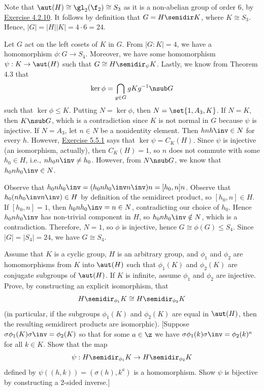 \begin{solalph}
    \item Note that $\aut(H) \cong \gl_2(\f_2) \cong S_3$ as it is a non-abelian group of order 6, by \hyperref[ex4.2.10]{Exercise 4.2.10}. It follows by definition that $G = H \semidir K$, where $K \cong S_3$. Hence, $|G| = |H||K| = 4 \cdot 6 = 24$.
    \item Let $G$ act on the left cosets of $K$ in $G$. From $|G : K| = 4$, we have a homomorphism $\phi : G \to S_4$. Moreover, we have some homomorphism $\psi : K \to \aut(H)$ such that $G \cong H \semidir_\psi K$. Lastly, we know from Theorem 4.3 that
    \[\ker\phi = \bigcap_{g \in G} gKg^{-1} \nsub G\]
    such that $\ker\phi \leq K$. Putting $N = \ker\phi$, then $N = \set{1, A_3, K}$. If $N = K$, then $K \nsub G$, which is a contradiction since $K$ is not normal in $G$ because $\psi$ is injective. If $N = A_3$, let $n \in N$ be a nonidentity element. Then $hnh\inv \in N$ for every $h$. However, \hyperref[ex5.5.1]{Exercise 5.5.1} says that $\ker\psi = C_K(H)$. Since $\psi$ is injective (an isomorphism, actually), then $C_K(H) = 1$, so $n$ does not commute with some $h_0 \in H$, i.e., $nh_0n\inv \neq h_0$. However, from $N \nsub G$, we know that $h_0nh_0\inv \in N$. 
    
    Observe that $h_0nh_0\inv = (h_0nh_0\inv n\inv)n = [h_0, n]n$. Observe that $h_0(nh_0\inv n\inv) \in H$ by definition of the semidirect product, so $[h_0, n] \in H$. If $[h_0, n] = 1$, then $h_0nh_0\inv = n \in N$, contradicting our choice of $h_0$. Hence $h_0nh_0\inv$ has non-trivial component in $H$, so $h_0nh_0\inv \notin N$, which is a contradiction. Therefore, $N = 1$, so $\phi$ is injective, hence $G \cong \phi(G) \leq S_4$. Since $|G| = |S_4| = 24$, we have $G \cong S_4$.
\end{solalph}

\begin{specialexercise}\label{ex5.5.6}
    Assume that $K$ is a cyclic group, $H$ is an arbitrary group, and $\phi_1$ and $\phi_2$ are homomorphisms from $K$ into $\aut(H)$ such that $\phi_1(K)$ and $\phi_2(K)$ are conjugate subgroups of $\aut(H)$. If $K$ is infinite, assume $\phi_1$ and $\phi_2$ are injective. Prove, by constructing an explicit isomorphism, that
    \[H \semidir_{\phi_1} K \cong H \semidir_{\phi_2} K\]
    (in particular, if the subgroups $\phi_1(K)$ and $\phi_2(K)$ are equal in $\aut(H)$, then the resulting semidirect products are isomorphic). [Suppose $\sigma\phi_1(K)\sigma\inv = \phi_2(K)$ so that for some $a \in \z$ we have $\sigma\phi_1(k)\sigma\inv = \phi_2(k)^a$ for all $k \in K$. Show that the map
    \[\psi : H \semidir_{\phi_1} K \to H \semidir_{\phi_2} K\]
    defined by $\psi((h,k)) = (\sigma(h), k^a)$ is a homomorphism. Show $\psi$ is bijective by constructing a 2-sided inverse.]
\end{specialexercise}

